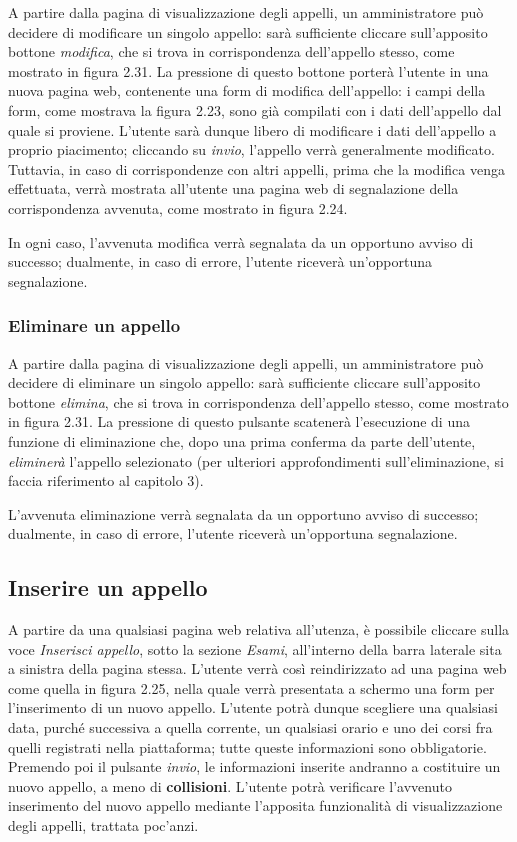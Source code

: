 \documentclass [a4paper,11pt]{book}
\begin{document}
A partire dalla pagina di visualizzazione degli appelli, un amministratore può decidere di modificare un singolo appello: sarà sufficiente cliccare sull'apposito bottone \emph{modifica}, che si trova in corrispondenza dell'appello stesso, come mostrato in figura 2.31. La pressione di questo bottone porterà l'utente in una nuova pagina web, contenente una form di modifica dell'appello: i campi della form, come mostrava la figura 2.23, sono già compilati con i dati dell'appello dal quale si proviene. L'utente sarà dunque libero di modificare i dati dell'appello a proprio piacimento; cliccando su \emph{invio}, l'appello verrà generalmente modificato. Tuttavia, in caso di corrispondenze con altri appelli, prima che la modifica venga effettuata, verrà mostrata all'utente una pagina web di segnalazione della corrispondenza avvenuta, come mostrato in figura 2.24.

In ogni caso, l'avvenuta modifica verrà segnalata da un opportuno avviso di successo; dualmente, in caso di errore, l'utente riceverà un'opportuna segnalazione.

\medskip

\subsubsection{Eliminare un appello}

A partire dalla pagina di visualizzazione degli appelli, un amministratore può decidere di eliminare un singolo appello: sarà sufficiente cliccare sull'apposito bottone \emph{elimina}, che si trova in corrispondenza dell'appello stesso, come mostrato in figura 2.31. La pressione di questo pulsante scatenerà l'esecuzione di una funzione di eliminazione che, dopo una prima conferma da parte dell'utente, \emph{eliminerà} l'appello selezionato (per ulteriori approfondimenti sull'eliminazione, si faccia riferimento al capitolo 3).

L'avvenuta eliminazione verrà segnalata da un opportuno avviso di successo; dualmente, in caso di errore, l'utente riceverà un'opportuna segnalazione.

\medskip

\subsection{Inserire un appello}

A partire da una qualsiasi pagina web relativa all'utenza, è possibile cliccare sulla voce \emph{Inserisci appello}, sotto la sezione \emph{Esami}, all'interno della barra laterale sita a sinistra della pagina stessa. L'utente verrà così reindirizzato ad una pagina web come quella in figura 2.25, nella quale verrà presentata a schermo una form per l'inserimento di un nuovo appello. L'utente potrà dunque scegliere una qualsiasi data, purché successiva a quella corrente, un qualsiasi orario e uno dei corsi fra quelli registrati nella piattaforma; tutte queste informazioni sono obbligatorie. Premendo poi il pulsante \emph{invio}, le informazioni inserite andranno a costituire un nuovo appello, a meno di \textbf{collisioni}. L'utente potrà verificare l'avvenuto inserimento del nuovo appello mediante l'apposita funzionalità di visualizzazione degli appelli, trattata poc'anzi.
\end{document}
